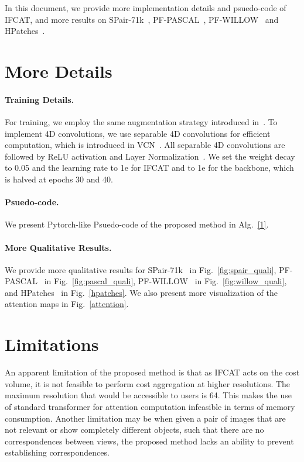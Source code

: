 
In this document, we provide more implementation details and psuedo-code of IFCAT,  and more results on SPair-71k~\cite{min2019spair}, PF-PASCAL~\cite{ham2017proposal}, PF-WILLOW~\cite{ham2016proposal} and HPatches~\cite{balntas2017hpatches}.

\section*{More Details}



\paragraph{Training Details.}
For training, we employ the same augmentation strategy introduced in~\cite{cho2021semantic}. To implement 4D convolutions, we use separable 4D convolutions for efficient computation, which is introduced in VCN~\cite{yang2019volumetric}. All separable 4D convolutions are followed by ReLU activation and Layer Normalization~\cite{ba2016layer}. We set the weight decay to 0.05 and the learning rate to 1e for IFCAT and to 1e for the backbone, which is halved at epochs 30 and 40. 


\paragraph{Psuedo-code.}
We present Pytorch-like Psuedo-code of the proposed method in Alg.~\ref{1}.



\paragraph{More Qualitative Results.}
We provide more qualitative results for SPair-71k~\cite{min2019spair} in Fig.~\ref{fig:spair_quali}, PF-PASCAL~\cite{ham2017proposal} in Fig.~\ref{fig:pascal_quali}, PF-WILLOW~\cite{ham2017proposal} in Fig.~\ref{fig:willow_quali}, and HPatches~\cite{balntas2017hpatches} in Fig.~\ref{hpatches}. We also present more visualization of the attention maps in Fig.~\ref{attention}.

\section*{Limitations}
An apparent limitation of the proposed method is that as IFCAT acts on the cost volume, it is not feasible to perform cost aggregation at higher resolutions. The maximum resolution that would be accessible to users is 64. This makes the use of standard transformer for attention computation infeasible in terms of memory consumption. Another limitation may be when given a pair of images that are not relevant or show completely different objects, such that there are no correspondences between views, the proposed method lacks an ability to prevent establishing correspondences. 

